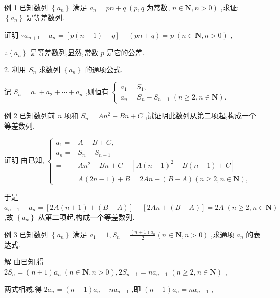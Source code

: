 \documentclass[10pt]{article}
\begin{document}
例 1 已知数列 \(\left\{  {a}_{n}\right\}\) 满足 \({a}_{n} = {pn} + q\;\left( {p,q\text{ 为常数, }n \in  \mathbf{N},n > 0}\right)\) ,求证: \(\left\{  {a}_{n}\right\}\) 是等差数列.

证明 \(\because {a}_{n + 1} - {a}_{n} = \left\lbrack  {p\left( {n + 1}\right)  + q}\right\rbrack   - \left( {{pn} + q}\right)  = p\;\left( {n \in  \mathbf{N},n > 0}\right)\) ,

\(\therefore \left\{  {a}_{n}\right\}\) 是等差数列,显然,常数 \(p\) 是它的公差.

2. 利用 \({S}_{n}\) 求数列 \(\left\{  {a}_{n}\right\}\) 的通项公式.

记 \({S}_{n} = {a}_{1} + {a}_{2} + \cdots  + {a}_{n}\) ,则恒有 \(\left\{  \begin{array}{l} {a}_{1} = {S}_{1}, \\  {a}_{n} = {S}_{n} - {S}_{n - 1}\;\left( {n \geq  2,n \in  \mathbf{N}}\right) . \end{array}\right.\)

例 2 已知数列前 \(n\) 项和 \({S}_{n} = A{n}^{2} + {Bn} + C\) ,试证明此数列从第二项起,构成一个等差数列.

证明 由已知, \(\begin{cases} {a}_{1} = & A + B + C, \\  {a}_{n} = & {S}_{n} - {S}_{n - 1} \\   = & A{n}^{2} + {Bn} + C - \left\lbrack  {A{\left( n - 1\right) }^{2} + B\left( {n - 1}\right)  + C}\right\rbrack  \\   = & A\left( {{2n} - 1}\right)  + B = {2An} + \left( {B - A}\right) \left( {n \geq  2,n \in  \mathbf{N}}\right) , \end{cases}\)

于是 \({a}_{n + 1} - {a}_{n} = \left\lbrack  {{2A}\left( {n + 1}\right)  + \left( {B - A}\right) }\right\rbrack   - \left\lbrack  {{2An} + \left( {B - A}\right) }\right\rbrack   = {2A}\;\left( {n \geq  2,n \in  \mathbf{N}}\right)\) ,故 \(\left\{  {a}_{n}\right\}\) 从第二项起,构成一个等差数列.

例 3 已知数列 \(\left\{  {a}_{n}\right\}\) 满足 \({a}_{1} = 1,{S}_{n} = \frac{\left( {n + 1}\right) {a}_{n}}{2}\left( {n \in  \mathbf{N},n > 0}\right)\) ,求通项 \({a}_{n}\) 的表达式.

解 由已知,得 \(2{S}_{n} = \left( {n + 1}\right) {a}_{n}\;\left( {n \in  \mathbf{N},n > 0}\right) ,2{S}_{n - 1} = n{a}_{n - 1}\;\left( {n \geq  2,n \in  \mathbf{N}}\right)\) ,

两式相减,得 \(2{a}_{n} = \left( {n + 1}\right) {a}_{n} - n{a}_{n - 1}\) ,即 \(\left( {n - 1}\right) {a}_{n} = n{a}_{n - 1}\) ,
\end{document}

